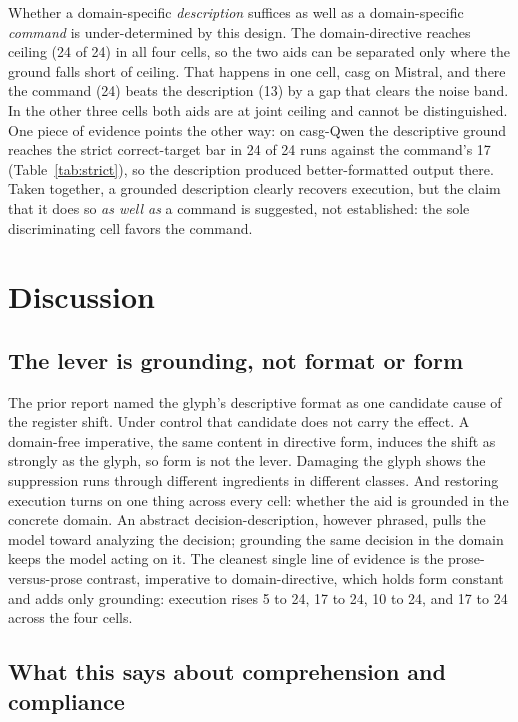 \documentclass[11pt,a4paper]{article}
\begin{document}
Whether a domain-specific \emph{description} suffices as well as a domain-specific
\emph{command} is under-determined by this design. The domain-directive reaches
ceiling (24 of 24) in all four cells, so the two aids can be separated only where the
ground falls short of ceiling. That happens in one cell, casg on Mistral, and there
the command (24) beats the description (13) by a gap that clears the noise band. In
the other three cells both aids are at joint ceiling and cannot be distinguished. One
piece of evidence points the other way: on casg-Qwen the descriptive ground reaches
the strict correct-target bar in 24 of 24 runs against the command's 17
(Table~\ref{tab:strict}), so the description produced better-formatted output there.
Taken together, a grounded description clearly recovers execution, but the claim that
it does so \emph{as well as} a command is suggested, not established: the sole
discriminating cell favors the command.

\section{Discussion}

\subsection{The lever is grounding, not format or form}

The prior report named the glyph's descriptive format as one candidate cause of the
register shift. Under control that candidate does not carry the effect. A domain-free
imperative, the same content in directive form, induces the shift as strongly as the
glyph, so form is not the lever. Damaging the glyph shows the suppression runs
through different ingredients in different classes. And restoring execution turns on
one thing across every cell: whether the aid is grounded in the concrete domain. An
abstract decision-description, however phrased, pulls the model toward analyzing the
decision; grounding the same decision in the domain keeps the model acting on it. The
cleanest single line of evidence is the prose-versus-prose contrast, imperative to
domain-directive, which holds form constant and adds only grounding: execution rises
5 to 24, 17 to 24, 10 to 24, and 17 to 24 across the four cells.

\subsection{What this says about comprehension and compliance}
\end{document}
